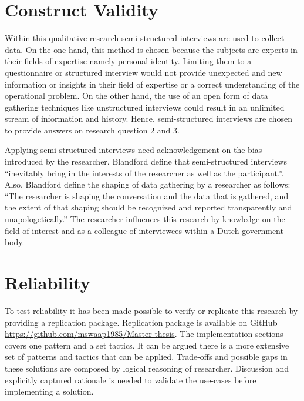 \section{Construct Validity}
Within this qualitative research semi-structured interviews are used to collect data. On the one hand, this method is chosen because the subjects are experts in their fields of expertise namely personal identity. Limiting them to a questionnaire or structured interview would not provide unexpected and new information or insights in their field of expertise or a correct understanding of the operational problem. On the other hand, the use of an open form of data gathering techniques like unstructured interviews could result in an unlimited stream of information and history. Hence, semi-structured interviews are chosen to provide answers on research question 2 and 3.  
\par
Applying semi-structured interviews need acknowledgement on the bias introduced by the researcher. Blandford \etal \cite{Blandford2016QualitativeHR} define that semi-structured interviews “inevitably bring in the interests of the researcher as well as the participant.”. Also, Blandford \etal define the shaping of data gathering by a researcher as follows: “The researcher is shaping the conversation and the data that is gathered, and the extent of that shaping should be recognized and reported transparently and unapologetically.” The researcher influences this research by knowledge on the field of interest and as a colleague of interviewees within a Dutch government body.

\section{Reliability}
To test reliability it has been made possible to verify or replicate this research by providing a replication package. Replication package is available on GitHub \url{https://github.com/mswaap1985/Master-thesis}.
The implementation sections covers one pattern and a set tactics. It can be argued there is a more extensive set of patterns and tactics that can be applied.
Trade-offs and possible gaps in these solutions are composed by logical reasoning of researcher. Discussion and explicitly captured rationale is needed to validate the use-cases before implementing a solution. 